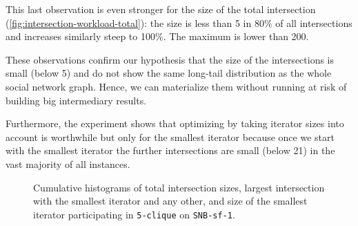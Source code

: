 This last observation is even stronger for the size of the total intersection (\cref{fig:intersection-workload-total}):
the size is less than 5 in 80\% of all intersections and increases similarly steep to 100\%.
The maximum is lower than 200.

These observations confirm our hypothesis that the size of the intersections is small (below 5) and do not show the same long-tail
distribution as the whole social network graph.
Hence, we can materialize them without running at risk of building big intermediary results.

Furthermore, the experiment shows that optimizing by taking iterator sizes into account is worthwhile but only for the smallest iterator
because
once we start with the smallest iterator the further intersections are small (below 21) in the vast majority of all instances.


\begin{figure}[H]
    \centering
    \hfill
    \hfill
    \caption{Cumulative histograms of total intersection sizes, largest intersection with the smallest iterator and any other, and size of the
    smallest iterator participating in \texttt{5-clique} on \texttt{SNB-sf-1}.}
    \label{fig:intersection-workload}
\end{figure}

